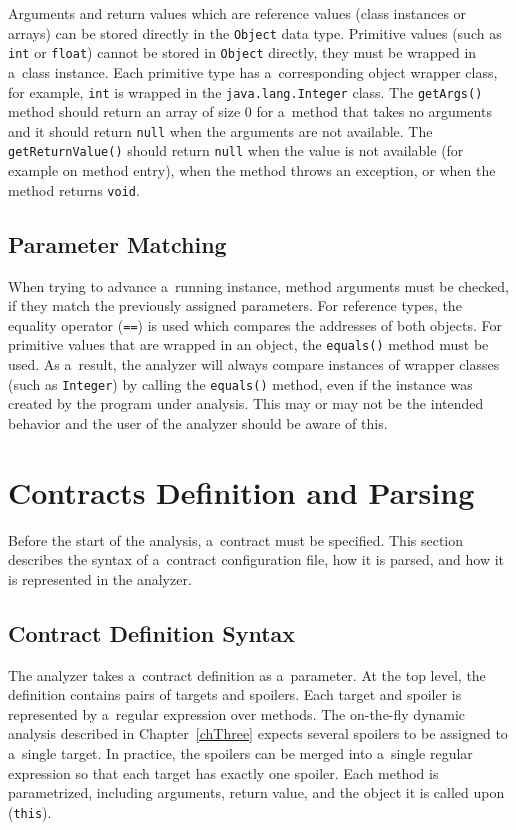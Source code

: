 Arguments and return values which are reference values (class instances or
arrays) can be stored directly in the \texttt{Object} data type. Primitive
values (such as \texttt{int} or \texttt{float}) cannot be stored in
\texttt{Object} directly, they must be wrapped in a~class instance. Each
primitive type has a~corresponding object wrapper class, for example,
\texttt{int} is wrapped in the \texttt{java.lang.Integer} class. The
\texttt{getArgs()} method should return an array of size 0 for a~method that
takes no arguments and it should return \texttt{null} when the arguments are not
available. The \texttt{getReturnValue()} should return \texttt{null} when the
value is not available (for example on method entry), when the method throws an
exception, or when the method returns \texttt{void}.

\subsection{Parameter Matching}
When trying to advance a~running instance, method arguments must be checked, if
they match the previously assigned parameters. For reference types, the equality
operator (\texttt{==}) is used which compares the addresses of both objects. For
primitive values that are wrapped in an object, the \texttt{equals()} method
must be used. As a~result, the analyzer will always compare instances of wrapper
classes (such as \texttt{Integer}) by calling the \texttt{equals()} method, even
if the instance was created by the program under analysis. This may or may not
be the intended behavior and the user of the analyzer should be aware of this.

\section{Contracts Definition and Parsing}
\label{contracts}

Before the start of the analysis, a~contract must be specified. This section
describes the syntax of a~contract configuration file, how it is parsed, and how
it is represented in the analyzer.

\subsection{Contract Definition Syntax}

The analyzer takes a~contract definition as a~parameter. At the top level, the
definition contains pairs of targets and spoilers. Each target and spoiler is
represented by a~regular expression over methods. The on-the-fly dynamic
analysis described in Chapter~\ref{chThree} expects several spoilers to be
assigned to a~single target. In practice, the spoilers can be merged into
a~single regular expression so that each target has exactly one spoiler. Each
method is parametrized, including arguments, return value, and the object it is
called upon (\texttt{this}).

